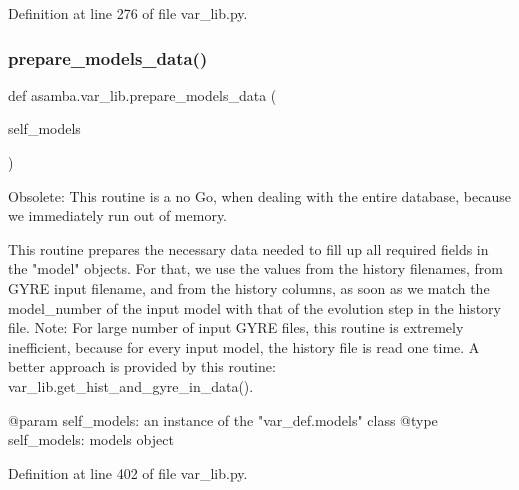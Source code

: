 Definition at line 276 of file var\+\_\+lib.\+py.

\mbox{\label{namespaceasamba_1_1var__lib_ac3a34f468d31f54f0d29486fbd1d3ab5}} 
\subsubsection{\texorpdfstring{prepare\+\_\+models\+\_\+data()}{prepare\_models\_data()}}
{\footnotesize\ttfamily def asamba.\+var\+\_\+lib.\+prepare\+\_\+models\+\_\+data (\begin{DoxyParamCaption}\item[{}]{self\+\_\+models }\end{DoxyParamCaption})}

\begin{DoxyVerb}Obsolete: This routine is a no Go, when dealing with the entire database, because we immediately 
run out of memory.

This routine prepares the necessary data needed to fill up all required fields in the "model" objects.
For that, we use the values from the history filenames, from GYRE input filename, and from the history
columns, as soon as we match the model_number of the input model with that of the evolution step in
the history file.
Note: For large number of input GYRE files, this routine is extremely inefficient, because for every 
input model, the history file is read one time. A better approach is provided by this routine:
var_lib.get_hist_and_gyre_in_data().

@param self_models: an instance of the "var_def.models" class 
@type self_models: models object\end{DoxyVerb}
 

Definition at line 402 of file var\+\_\+lib.\+py.

